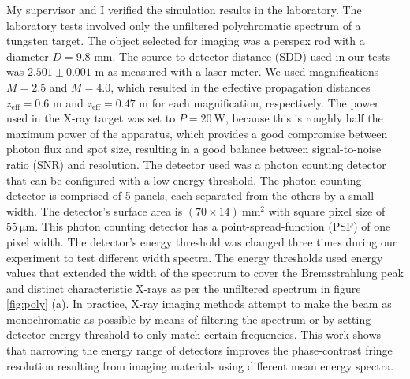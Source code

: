 \documentclass[10pt, a4paper, singlespacing]{report}
\begin{document}
My supervisor and I verified the simulation results in the laboratory. The laboratory tests involved only the unfiltered polychromatic spectrum of a tungsten target. The object selected for imaging was a perspex rod with a diameter $D = 9.8$ mm. The source-to-detector distance (SDD) used in our tests was $2.501 \pm 0.001$ m as measured with a laser meter. We used magnifications $M = 2.5$ and $M = 4.0$, which resulted in the effective propagation distances $z_{\mathrm{eff}} = 0.6$ m and $z_{\mathrm{eff}} = 0.47$ m for each magnification, respectively. The power used in the X-ray target was set to $P = 20~\mathrm{W}$, because this is roughly half the maximum power of the apparatus, which provides a good compromise between photon flux and spot size, resulting in a good balance between signal-to-noise ratio (SNR) and resolution. The detector used was a photon counting detector that can be configured with a low energy threshold. 
The photon counting detector is comprised of 5 panels, each separated from the others by a small width. The detector's surface area is $(70\times14)~\mathrm{mm}^2$ with square pixel size of $55~\mathrm{\mu m}$. This photon counting detector has a point-spread-function (PSF) of one pixel width.
The detector's energy threshold was changed three times during our experiment to test different width spectra. The energy thresholds used energy values that extended the width of the spectrum to cover the Bremsstrahlung peak and distinct characteristic X-rays as per the unfiltered spectrum in figure \ref{fig:poly} (a).
In practice, X-ray imaging methods attempt to make the beam as monochromatic as possible by means of filtering the spectrum or by setting detector energy threshold to only match certain frequencies. This work shows that narrowing the energy range of detectors improves the phase-contrast fringe resolution resulting from imaging materials using different mean energy spectra.


\end{document}
